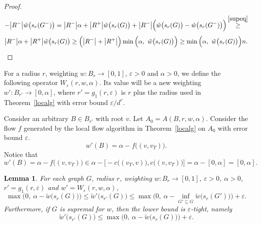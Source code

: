 \documentclass[12pt,a4paper]{article}
\newtheorem{Lemma}[Theorem]{Lemma}
\newcommand{\eps}{\varepsilon}
\renewcommand{\:}{\colon}
\begin{document}
\begin{proof}
\begin{equation*}
\end{equation*}
\begin{equation*}
- \big|R^-\big| \tilde{w}\big(s_r(G^-)\big) = \big|R^-\big| \alpha + \big|R^+\big| \tilde{w}\big(s_r(G)\big) + \big|R^-\big| \Big( \tilde{w}\big(s_r(G)\big) - \tilde{w}\big(s_r(G^-)\big) \Big) \mathop{\ge}^{\eqref{supeq}}
\end{equation*}
\begin{equation*}
\big|R^-\big| \alpha + \big|R^+\big| \tilde{w}\big(s_r(G)\big)
\ge \Big(\big|R^-\big| + \big|R^+\big|\Big) \min\Big(\alpha,\ \tilde{w}\big(s_r(G)\big)\Big)
\ge \min\Big(\alpha,\ \tilde{w}\big(s_r(G)\big)\Big) n. \qedhere
\end{equation*}
\end{proof}

For a radius $r$, weighting $w \: B_r \rightarrow [0, 1]$, $\eps > 0$ and $\alpha > 0$, we define the following operator $W_{\eps}(r, w, \alpha)$. Its value will be a new weighting $w' \: B_{r'} \rightarrow [0, \alpha]$, where $r' = g_1(r, \eps)$ is $r$ plus the radius used in Theorem~\ref{localg} with error bound $\eps / d^r$.

Consider an arbitrary $B \in B_{r'}$ with root $v$. Let $A_0 = A(B, r, w, \alpha)$. Consider the flow $f$ generated by the local flow algorithm in Theorem~\ref{localg} on $A_0$ with error bound $\eps$. \begin{equation} \label{wprimedef}
w'(B) = \alpha - f\big((v, v_T)\big).
\end{equation}
Notice that
\begin{equation} \label{wsupport}
w'(B) = \alpha - f\big((v, v_T)\big) \in \alpha - \Big[-c\big((v_T, v)\big), c\big((v, v_T)\big)\Big] = \alpha - [0, \alpha] = [0, \alpha].
\end{equation}

\begin{Lemma} \label{WHG}
For each graph $G$, radius $r$, weighting $w \: B_r \rightarrow [0, 1]$, $\eps > 0$, $\alpha > 0$, $r' = g_1(r, \eps)$ and $w' = W_{\eps}(r, w, \alpha)$,
\begin{equation} \label{lower}
\max\Big(0,\ \alpha - \tilde{w}\big(s_r(G)\big)\Big) \le \tilde{w}'\big(s_{r'}(G)\big) \le \max\Big(0,\ \alpha - \inf_{G' \subseteq G} \tilde{w}\big(s_r(G')\big)\Big) + \eps.
\end{equation}
Furthermore, if $G$ is supremal for $w$, then the lower bound is $\eps$-tight, namely
\begin{equation} \label{epsbound}
\tilde{w}'\big(s_{r'}(G)\big) \le \max\Big(0,\ \alpha - \tilde{w}\big(s_r(G)\big)\Big) + \eps.
\end{equation}
\end{Lemma}
\end{document}
